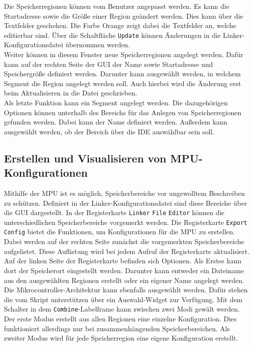 Die Speicherregionen können vom Benutzer angepasst werden.
Es kann die Startadresse sowie die Größe einer Region geändert werden.
Dies kann über die Textfelder geschehen.
Die Farbe Orange zeigt dabei die Textfelder an, welche editierbar sind.
Über die Schaltfläche \verb*|Update| können Änderungen in die Linker-Konfigurationsdatei übernommen werden. \\

Weiter können in diesem Fenster neue Speicherregionen angelegt werden.
Dafür kann auf der rechten Seite der \ac{GUI} der Name sowie Startadresse und Speichergröße definiert werden.
Darunter kann ausgewählt werden, in welchem Segment die Region angelegt werden soll.
Auch hierbei wird die Änderung erst beim Aktualisieren in die Datei geschrieben. \\

Als letzte Funktion kann ein Segment angelegt werden.
Die dazugehörigen Optionen können unterhalb des Bereichs für das Anlegen von Speicherregionen gefunden werden.
Dabei kann der Name definiert werden.
Außerdem kann ausgewählt werden, ob der Bereich über die \ac{IDE} auswählbar sein soll.

\subsection{Erstellen und Visualisieren von MPU-Konfigurationen}
Mithilfe der \ac{MPU} ist es möglich, Speicherbereiche vor ungewolltem Beschreiben zu schützen.
Definiert in der Linker-Konfigurationsdatei sind diese Bereiche über die \ac{GUI} dargestellt.
In der Registerkarte \verb*|Linker| \verb*|File| \verb*|Editor| können die unterschiedlichen Speicherbereiche vorgemerkt werden.
Die Registerkarte \verb*|Export| \verb*|Config| bietet die Funktionen, um Konfigurationen für die \ac{MPU} zu erstellen. \\

Dabei werden auf der rechten Seite zunächst die vorgemerkten Speicherbereiche aufgelistet.
Diese Auflistung wird bei jedem Aufruf der Registerkarte aktualisiert.
Auf der linken Seite der Registerkarte befinden sich Optionen.
Als Erstes kann dort der Speicherort eingestellt werden.
Darunter kann entweder ein Dateiname aus den ausgewählten Regionen erstellt oder ein eigener Name angelegt werden.
Die Mikrocontroller-Architektur kann ebenfalls ausgewählt werden.
Dafür stehen die vom Skript unterstützen über ein Auswahl-Widget zur Verfügung.
Mit dem Schalter in dem \verb*|Combine|-Labelframe kann zwischen zwei Modi gewält werden.
Der erste Modus erstellt aus allen Regionen eine einzelne Konfiguration.
Dies funktioniert allerdings nur bei zusammenhängenden Speicherbereichen.
Als zweiter Modus wird für jede Speicherregion eine eigene Konfiguration erstellt. \\

